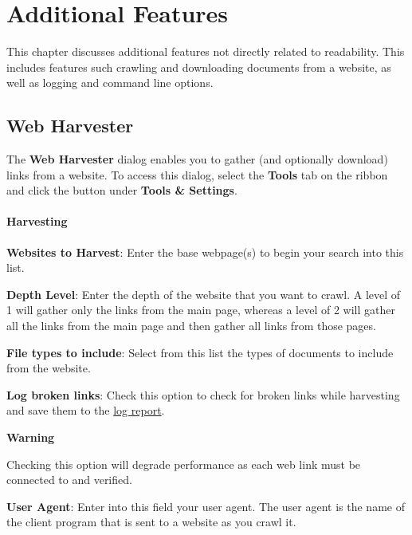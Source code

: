 \documentclass[
]{book}
\newenvironment{warningsection}
    {
    \begin{tcolorbox}[colframe=lightgray,colback=lightpink,arc=3mm]
    \faLightbulb[regular] \textbf{{Warning} } \newline
    }
    {
    \end{tcolorbox}
    }
\theoremstyle{definition}
\theoremstyle{definition}
\theoremstyle{definition}
\theoremstyle{definition}
\theoremstyle{remark}
\begin{document}
\hypertarget{additional-features}{%
\chapter{Additional Features}\label{additional-features}}

This chapter discusses additional features not directly related to readability. This includes features such crawling and downloading documents from a website, as well as logging and command line options.

\hypertarget{web-harvester}{%
\section{Web Harvester}\label{web-harvester}}

The \textbf{Web Harvester} dialog enables you to gather (and optionally download) links from a website. To access this dialog, select the \textbf{Tools} tab on the ribbon and click the  button under \textbf{Tools \& Settings}.

\hypertarget{harvesting}{%
\subsubsection*{Harvesting}\label{harvesting}}

\textbf{Websites to Harvest}: Enter the base webpage(s) to begin your search into this list.

\textbf{Depth Level}: Enter the depth of the website that you want to crawl. A level of 1 will gather only the links from the main page, whereas a level of 2 will gather all the links from the main page and then gather all links from those pages.

\textbf{File types to include}: Select from this list the types of documents to include from the website.

\textbf{Log broken links}: Check this option to check for broken links while harvesting and save them to the \protect\hyperlink{log-report}{log report}.

\begin{warningsection}
Checking this option will degrade performance as each web link must be connected to and verified.

\end{warningsection}

\textbf{User Agent}: Enter into this field your user agent. The user agent is the name of the client program that is sent to a website as you crawl it.
\end{document}
